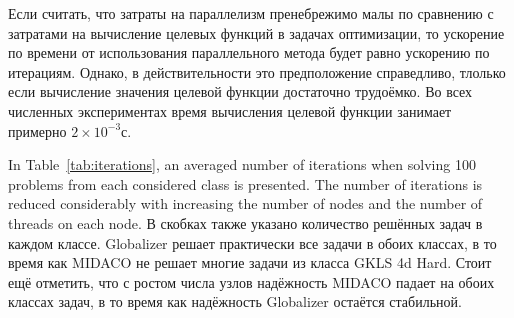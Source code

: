 \documentclass{svproc}
\begin{document}
\begin{Russian}
Если считать, что затраты на параллелизм пренебрежимо малы по сравнению с затратами на вычисление целевых функций в задачах оптимизации, то ускорение по времени от использования параллельного метода будет равно ускорению по итерациям. Однако, в действительности это предположение справедливо,
тлолько если вычисление значения целевой функции достаточно трудоёмко. Во всех численных экспериментах время вычисления целевой функции занимает примерно $2\times 10^{-3}$с.

In Table~\ref{tab:iterations}, an averaged number of iterations when solving 100 problems from
each considered class is presented.
The number of iterations is reduced considerably with increasing the number of nodes and the
number of threads on each node. В скобках также указано количество решённых задач в каждом классе.
Globalizer решает практически все задачи в обоих классах, в то время как MIDACO не решает многие задачи из класса GKLS 4d Hard.
Стоит ещё отметить, что с ростом числа узлов надёжность MIDACO падает на обоих классах задач, в то время как надёжность Globalizer остаётся стабильной.


\end{Russian}
\end{document}
